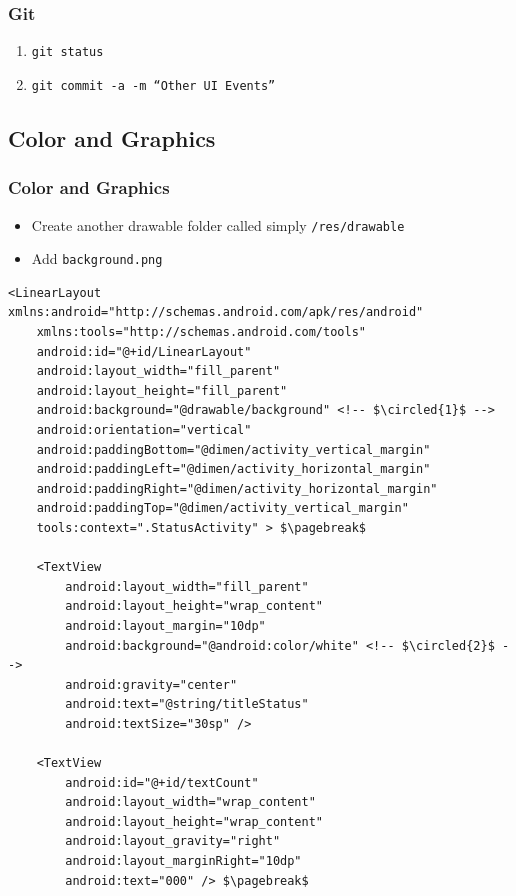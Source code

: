 \begin{frame}[fragile]
\frametitle{Git}
\begin{enumerate}
\item \texttt{git status}
\item \texttt{git commit -a -m ``Other UI Events''}
\end{enumerate}

\end{frame}

\subsection{Color and Graphics}
\begin{frame}
\frametitle{Color and Graphics}
\begin{itemize}
\item Create another drawable folder called simply \texttt{/res/drawable}
\item Add \texttt{background.png}
\end{itemize}

\lstset{language=XML, style=eclipse}
\begin{lstlisting}[caption=res/layout/activity\_status.xml, basicstyle=\scriptsize,escapechar=$]
<LinearLayout xmlns:android="http://schemas.android.com/apk/res/android"
    xmlns:tools="http://schemas.android.com/tools"
    android:id="@+id/LinearLayout"
    android:layout_width="fill_parent"
    android:layout_height="fill_parent"
    android:background="@drawable/background" <!-- $\circled{1}$ -->
    android:orientation="vertical"
    android:paddingBottom="@dimen/activity_vertical_margin"
    android:paddingLeft="@dimen/activity_horizontal_margin"
    android:paddingRight="@dimen/activity_horizontal_margin"
    android:paddingTop="@dimen/activity_vertical_margin"
    tools:context=".StatusActivity" > $\pagebreak$

    <TextView
        android:layout_width="fill_parent"
        android:layout_height="wrap_content"
        android:layout_margin="10dp"
        android:background="@android:color/white" <!-- $\circled{2}$ -->
        android:gravity="center"
        android:text="@string/titleStatus"
        android:textSize="30sp" />

    <TextView
        android:id="@+id/textCount"
        android:layout_width="wrap_content"
        android:layout_height="wrap_content"
        android:layout_gravity="right"
        android:layout_marginRight="10dp"
        android:text="000" /> $\pagebreak$
	

\end{lstlisting}
\end{frame}
